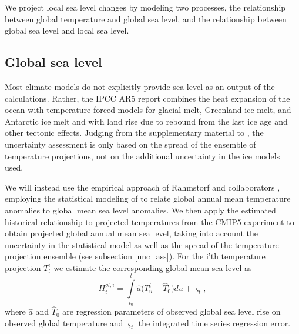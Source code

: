 \documentclass[note,screen,british,11pt]{nrdoc}
\begin{document}
We project local sea level changes by modeling two processes, the relationship between global temperature and global sea level, and the relationship between global sea level and local sea level.


\subsection{Global sea level}
Most climate models do not explicitly provide sea level as an output of the calculations. Rather, the IPCC AR5 report \citep[ch.~13]{ipcc} combines the heat expansion of the ocean with temperature forced models for glacial melt, Greenland ice melt, and Antarctic ice melt and with land rise due to rebound from the last ice age and other tectonic effects. Judging from the supplementary material to \citet[ch.~13]{ipcc}, the uncertainty assessment is only based on the spread of the ensemble of temperature projections, not on the additional uncertainty in the ice models used.

We will instead use the empirical approach of Rahmstorf and collaborators \citep{Rahmstorf07,Rahmstorf11}, employing the statistical modeling of \citet{Bolin2014a} to relate global annual mean temperature anomalies to global mean sea level anomalies. 
We then apply the estimated historical relationship to projected temperatures from the CMIP5 experiment \citep{cmip5} to obtain projected global annual mean sea level, taking into account the uncertainty in the statistical model as well as the spread of the temperature projection ensemble (see subsection \ref{unc_ass}). 
For the i'th temperature projection $T_t^i$ we estimate the corresponding global mean sea level as
\[H_t^{gl,i} = \int\limits_{{t_0}}^t {{\hat a} (T_u^i - {{\hat T}_0}} )du + {\varsigma _t},\]
where ${\hat a}$ and ${\hat T}_0$ are regression parameters of observed global sea level  rise on observed global temperature and $\varsigma_t$ the integrated time series regression error.
\end{document}
